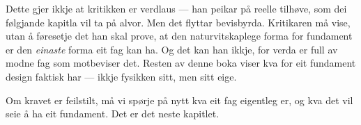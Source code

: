 Dette gjer ikkje at kritikken er verdlaus — han peikar på reelle tilhøve, som dei følgjande kapitla vil ta på alvor. Men det flyttar bevisbyrda. Kritikaren må vise, utan å føresetje det han skal prove, at den naturvitskaplege forma for fundament er den \emph{einaste} forma eit fag kan ha. Og det kan han ikkje, for verda er full av modne fag som motbeviser det. Resten av denne boka viser kva for eit fundament design faktisk har — ikkje fysikken sitt, men sitt eige.

\vignett

Om kravet er feilstilt, må vi spørje på nytt kva eit fag eigentleg er, og kva det vil seie å ha eit fundament. Det er det neste kapitlet.

